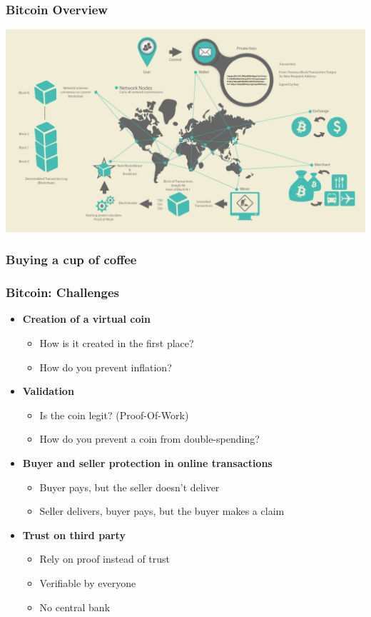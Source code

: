 \begin{frame}
    \frametitle{Bitcoin Overview}
    \includegraphics[scale=1]{./figures/mbc2_0201.png}
\end{frame}

\begin{frame}
    \frametitle{Buying a cup of coffee}

\end{frame}

\begin{frame}
    \frametitle{Bitcoin: Challenges}
    \begin{itemize}
        \item \textbf{Creation of a virtual coin}
            \begin{itemize}
                \item How is it created in the first place?
                \item How do you prevent inflation?
            \end{itemize}
        \item \textbf{Validation}
            \begin{itemize}
                \item Is the coin legit? \alert{(Proof-Of-Work)}
                \item How do you prevent a coin from \alert{double-spending}?
            \end{itemize}
        \item \textbf{Buyer and seller protection in online transactions}
            \begin{itemize}
                \item Buyer pays, but the seller doesn't deliver
                \item Seller delivers, buyer pays, but the buyer makes a claim
            \end{itemize}
        \item \textbf{Trust on third party}
            \begin{itemize}
                \item Rely on proof instead of trust
                \item Verifiable by everyone
                \item No central bank
            \end{itemize}
    \end{itemize}
\end{frame}

